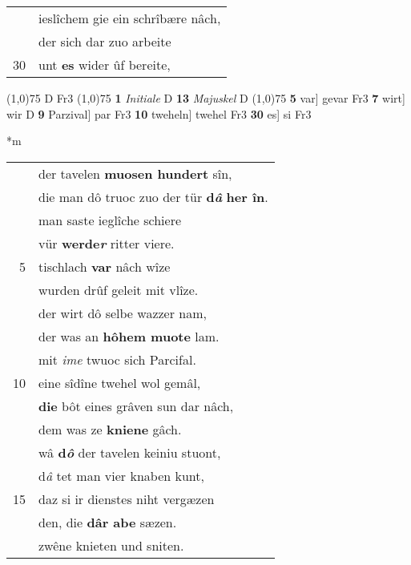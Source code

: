 \documentclass[8pt,a4paper,notitlepage]{article}
\begin{document}
\begin{table}[ht]
\begin{minipage}[t]{0.5\linewidth}
\begin{tabular}{rl}
 & ieslîchem gie ein schrîbære nâch,\\ 
 & der sich dar zuo arbeite\\ 
30 & unt \textbf{es} wider ûf bereite,\\ 
\end{tabular}
\scriptsize
\line(1,0){75} \newline
D Fr3 \newline
\line(1,0){75} \newline
\textbf{1} \textit{Initiale} D  \textbf{13} \textit{Majuskel} D  \newline
\line(1,0){75} \newline
\textbf{5} var] gevar Fr3 \textbf{7} wirt] wir D \textbf{9} Parzival] par Fr3 \textbf{10} tweheln] twehel Fr3 \textbf{30} es] si Fr3 \newline
\end{minipage}
\hspace{0.5cm}
\begin{minipage}[t]{0.5\linewidth}
\small
\begin{center}*m
\end{center}
\begin{tabular}{rl}
 & der tavelen \textbf{muosen hundert} sîn,\\ 
 & die man dô truoc zuo der tür \textbf{d\textit{â}} \textbf{her în}.\\ 
 & man saste ieglîche schiere\\ 
 & vür \textbf{werde\textit{r}} ritter viere.\\ 
5 & tischlach \textbf{var} nâch wîze\\ 
 & wurden drûf geleit mit vlîze.\\ 
 & der wirt dô selbe wazzer nam,\\ 
 & der was an \textbf{hôhem muote} lam.\\ 
 & mit \textit{ime} twuoc sich Parcifal.\\ 
10 & eine sîdîne twehel wol gemâl,\\ 
 & \textbf{die} bôt eines grâven sun dar nâch,\\ 
 & dem was ze \textbf{kniene} gâch.\\ 
 & wâ \textbf{d\textit{ô}} der tavelen keiniu stuont,\\ 
 & d\textit{â} tet man vier knaben kunt,\\ 
15 & daz si ir dienstes niht vergæzen\\ 
 & den, die \textbf{dâr abe} sæzen.\\ 
 & zwêne knieten und sniten.\\ 

\end{tabular}
\end{minipage}
\end{table}
\end{document}
